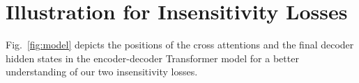 \appendix



		



\section{Illustration for Insensitivity Losses}
\label{sec:app-model}

Fig.~\ref{fig:model} depicts the positions of the cross attentions and the final decoder hidden states in the encoder-decoder Transformer model for a better understanding of our two insensitivity losses.

